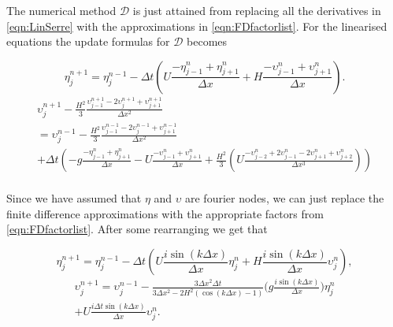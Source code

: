 The numerical method $\mathcal{D}$ is just attained from replacing all the derivatives in \eqref{eqn:LinSerre} with the approximations in \eqref{eqn:FDfactorlist}. For the linearised equations the update formulas for $\mathcal{D}$ becomes

	\begin{equation*}
	\eta^{n+1}_j = \eta^{n-1}_j - \Delta t \left(U \frac{- \eta^{n}_{j-1} + \eta^{n}_{j+1} }{\Delta x} + H \frac{- \upsilon^{n}_{j-1} + \upsilon^{n}_{j+1}}{\Delta x}\right).
	\end{equation*}
	\begin{multline*}
	\upsilon^{n+1}_j - \frac{H^2}{3}\frac{\upsilon^{n+1}_{j-1} -2\upsilon^{n+1}_{j} +\upsilon^{n+1}_{j+1} }{\Delta x^2} 
	\\ =  \upsilon^{n-1}_j - \frac{H^2}{3}\frac{\upsilon^{n-1}_{j-1} -2\upsilon^{n-1}_{j} +\upsilon^{n-1}_{j+1}}{\Delta x^2}   \\+  \Delta t\left(- g\frac{-\eta^n_{j-1} + \eta^n_{j+1} }{\Delta x}   - U\frac{-\upsilon^n_{j-1} + \upsilon^n_{j+1} }{\Delta x} + \frac{H^2}{3}\left(U \frac{-\upsilon^{n}_{j-2} +2\upsilon^{n}_{j-1} -2\upsilon^{n}_{j+1} +\upsilon^{n}_{j+2}}{\Delta x^3}  \right)\right)  \\
	\end{multline*}


Since we have assumed that $\eta$ and $\upsilon$ are fourier nodes, we can just replace the finite difference approximations with the appropriate factors from \eqref{eqn:FDfactorlist}. After some rearranging we get that

\begin{equation*}
\eta^{n+1}_j = \eta^{n-1}_j - \Delta t \left(U  \frac{i \sin\left(k \Delta x\right)}{\Delta x}\eta^n_j + H\frac{i \sin\left(k \Delta x\right)}{\Delta x} \upsilon^n_j \right),
\end{equation*}
\begin{multline*}
\upsilon^{n+1}_j  =  \upsilon^{n-1}_j  -  \frac{3 \Delta x^2\Delta t}{3 \Delta x^2 -2{H^2} \left( \cos\left(k \Delta x\right) - 1 \right)}\bigg( g \frac{i \sin\left(k \Delta x\right)}{\Delta x}     \bigg) \eta^n_j\\ + U\frac{i \Delta t \sin\left(k \Delta x\right)}{\Delta x} \upsilon^n_j.  \\
\end{multline*}
 
